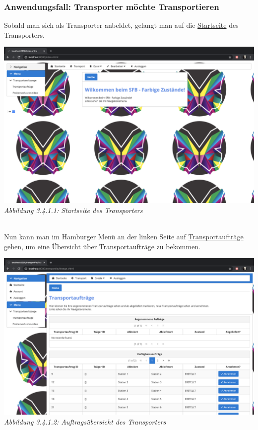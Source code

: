\documentclass[enabledeprecatedfontcommands,fontsize=12pt,paper=a4,twoside]{scrartcl}
\begin{document}
\subsubsection{Anwendungsfall: Transporter möchte Transportieren}

Sobald man sich als Transporter anbeldet, gelangt man auf die \hyperlink{sc3.4.1.1}{Startseite} des Transporters. 

\hypertarget{sc3.4.1.1}{
\includegraphics[width=1\textwidth]{Screenshots/3411.png}
\textit{Abbildung 3.4.1.1: Startseite des Transporters}
} \\

Nun kann man im Hamburger Menü an der linken Seite auf \hyperlink{sc3.4.1.2}{Transportaufträge} gehen, um eine Übersicht über Transportaufträge zu bekommen.

\hypertarget{sc3.4.1.2}{
\includegraphics[width=1\textwidth]{Screenshots/3412.png}
\textit{Abbildung 3.4.1.2: Auftragsübersicht des Transporters}
} \\
\end{document}
